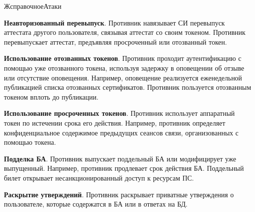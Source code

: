 \begin{appendix}{Ж}{справочное}{Атаки}

{\bf Неавторизованный перевыпуск}. 
Противник навязывает СИ перевыпуск аттестата
другого пользователя, связывая аттестат со своим токеном.
Противник перевыпускает аттестат, предъявляя просроченный 
или отозванный токен.


{\bf Использование отозванных токенов}. 
Противник проходит аутентификацию с помощью уже отозванного токена,
используя задержку в оповещении об отзыве или отсутствие оповещения.
%
Например, оповещение реализуется еженедельной публикацией списка 
отозванных сертификатов. Противник пользуется отозванным токеном вплоть до 
публикации. 


{\bf Использование просроченных токенов}. 
Противник использует аппаратный токен по истечении срока его действия.
Например, противник определяет конфиденциальное содержимое предыдущих 
сеансов связи, организованных с помощью токена.


\label{ATK.TM}

{\bf Подделка БА}.
Противник выпускает поддельный БА или модифицирует уже выпущенный.
%
Например, противник продлевает срок действия БА.
%
Поддельный билет открывает несанкционированный доступ к ресурсам ПС.


{\bf Раскрытие утверждений}.
Противник раскрывает приватные утверждения о пользователе,
которые содержатся в БА или в ответах на БД.



\end{appendix}
